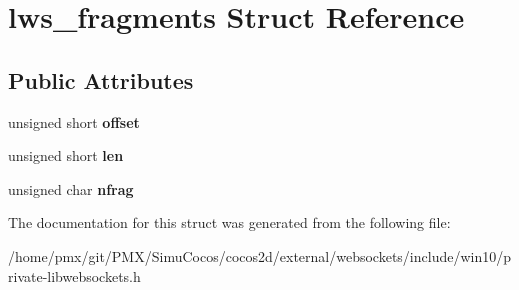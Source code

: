 \hypertarget{structlws__fragments}{}\section{lws\+\_\+fragments Struct Reference}
\label{structlws__fragments}
\subsection*{Public Attributes}
\begin{DoxyCompactItemize}
\item 
\mbox{\label{structlws__fragments_ae2524e8f779b7e5ff1cdbad81afd35ef}} 
unsigned short {\bfseries offset}
\item 
\mbox{\label{structlws__fragments_a56cb1d616d8131c213333fff13a80d0a}} 
unsigned short {\bfseries len}
\item 
\mbox{\label{structlws__fragments_acae2d38e9caadb30c945f3d828227c68}} 
unsigned char {\bfseries nfrag}
\end{DoxyCompactItemize}


The documentation for this struct was generated from the following file\+:\begin{DoxyCompactItemize}
\item 
/home/pmx/git/\+P\+M\+X/\+Simu\+Cocos/cocos2d/external/websockets/include/win10/private-\/libwebsockets.\+h\end{DoxyCompactItemize}
